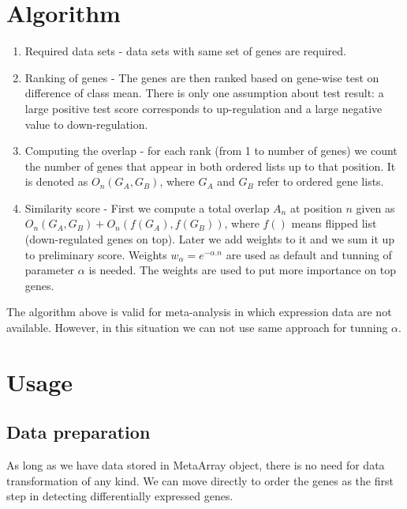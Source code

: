 \documentclass[a4paper]{report}
\begin{document}
\section*{Algorithm}
\begin{enumerate}
\item Required data sets - data sets with same set of genes are required. 
\item Ranking of genes - The genes are then ranked based on gene-wise test on difference of class mean. There is only one assumption about test result: a large positive test score corresponds to up-regulation and a large negative value to down-regulation. 
\item Computing the overlap - for each rank (from 1 to number of genes) we count the number of genes that appear in both ordered lists up to that position. It is denoted as $O_n(G_A,G_B)$, where $G_A$ and $G_B$ refer to ordered gene lists.
\item Similarity score - First we compute a total overlap $A_n$ at position $n$ given as $O_n(G_A,G_B)+O_n(f(G_A),f(G_B))$, where $f()$ means flipped list (down-regulated genes on top). Later we add weights to it and we sum it up to preliminary score. Weights $w_\alpha=e^{-\alpha.n}$ are used as default and tunning of parameter $\alpha$ is needed. The weights are used to put more importance on top genes. 

\end{enumerate}
The algorithm above is valid for meta-analysis in which expression data are not available. However, in this situation we can not use same approach for tunning $\alpha$. 
\section*{Usage}
\subsection*{Data preparation}
As long as we have data stored in MetaArray object, there is no need for data transformation of any kind. We can move directly to order the genes as the first step in detecting differentially expressed genes.
\end{document}
